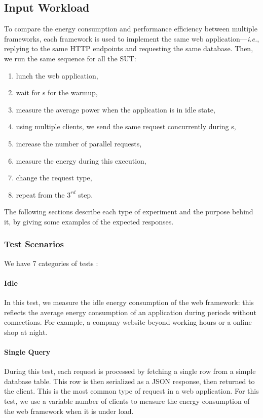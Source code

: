 \subsection{Input Workload}
To compare the energy consumption and performance efficiency between multiple frameworks, each framework is used to implement the same web application---\emph{i.e.}, replying to the same HTTP endpoints and requesting the same database. Then, we run the same sequence for all the SUT:
\begin{enumerate}
    \item lunch the web application,
    \item wait for \duration s for the warmup,
    \item measure the average power when the application is in idle state,
    \item using multiple clients, we send the same request concurrently during \duration s,
    \item increase the number of parallel requests,
    \item measure the energy during this execution,
    \item change the request type,
    \item repeat from the $3^{rd}$ step.
\end{enumerate}

The following sections describe each type of experiment and the purpose behind it, by giving some examples of the expected responses.

\subsubsection{Test Scenarios}
We have 7 categories of tests :
\paragraph{Idle}
In this test, we measure the idle energy consumption of the web framework: this reflects the average energy consumption of an application during periods without connections.
For example, a company website beyond working hours or a online shop at night.

\paragraph{Single Query}
During this test, each request is processed by fetching a single row from a simple database table.
This row is then serialized as a JSON response, then returned to the client.
This is the most common type of request in a web application.
For this test, we use a variable number of clients to measure the energy consumption of the web framework when it is under load.

